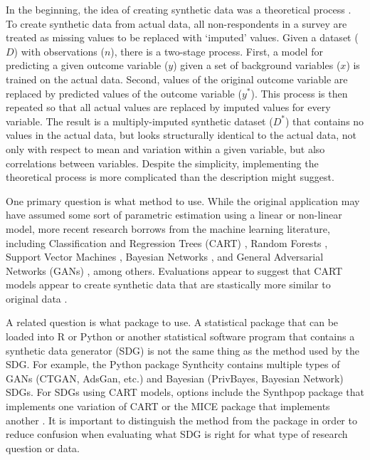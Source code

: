 \documentclass[runningheads]{llncs}
\begin{document}
In the beginning, the idea of creating synthetic data was a theoretical process \cite{rubin1993statistical}.  To create synthetic data from actual data, all non-respondents in a survey are treated as missing values to be replaced with `imputed' values.  Given a dataset ($D$) with observations ($n$), there is a two-stage process.  First, a model for predicting a given outcome variable ($y$) given a set of background variables ($x$) is trained on the actual data.  Second, values of the original outcome variable are replaced by predicted values of the outcome variable ($y^*$).  This process is then repeated so that all actual values are replaced by imputed values for every variable.  The result is a multiply-imputed synthetic dataset ($D^*$) that contains no values in the actual data, but looks structurally identical to the actual data, not only with respect to mean and variation within a given variable, but also correlations between variables.  Despite the simplicity, implementing the theoretical process is more complicated than the description might suggest.  

One primary question is what method to use.  While the original application may have assumed some sort of parametric estimation using a linear or non-linear model, more recent research borrows from the machine learning literature, including Classification and Regression Trees (CART) \cite{reiter2005using}, Random Forests \cite{caiola2010random}, Support Vector Machines \cite{drechsler2010using}, Bayesian Networks \cite{zhang2017privbayes}, and General Adversarial Networks (GANs) \cite{goodfellow2014generative}, among others.  Evaluations appear to suggest that CART models appear to create synthetic data that are stastically more similar to original data  \cite{little2022comparing,dankar2021fake,drechsler2011empirical}.  

A related question is what package to use.  A statistical package that can be loaded into R or Python or another statistical software program that contains a synthetic data generator (SDG) is not the same thing as the method used by the SDG.  For example, the Python package Synthcity \cite{synthcity} contains multiple types of GANs (CTGAN, AdsGan, etc.) and Bayesian (PrivBayes, Bayesian Network) SDGs.  For SDGs using CART models, options include the Synthpop package \cite{nowok2016synthpop} that implements one variation of CART \cite{reiter2005using} or the MICE package \cite{van2011mice} that implements another \cite{doove2014recursive}.  It is important to distinguish the method from the package in order to reduce confusion when evaluating what SDG is right for what type of research question or data.
\end{document}
